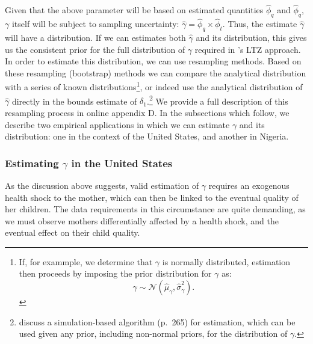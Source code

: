\documentclass[subeqn]{article}
\begin{document}
\begin{spacing}{1.4}
Given that the above parameter will be based on estimated quantities $\hat\phi_q$
and $\hat\phi_q$, $\gamma$ itself will be subject to sampling uncertainty:
$\hat\gamma = \hat\phi_q\times \hat\phi_t$.  Thus, the estimate $\hat\gamma$ will
have a distribution.  If we can estimates both $\hat\gamma$ and its distribution,
this gives us the consistent prior for the full distribution of $\gamma$ required
in \citeauthor{Conleyetal2012}'s LTZ approach.  In order to estimate this
distribution, we can use resampling methods.  Based on these resampling (bootstrap)
methods we can compare the analytical distribution with a series of known
distributions\footnote{If, for exammple, we determine that $\gamma$ is normally
  distributed, estimation then proceeds by imposing the prior distribution for
  $\gamma$ as:
  \begin{equation}
    \label{TWINeqn:ltz}
    \gamma \sim \mathcal{N}(\hat\mu_\gamma,\hat\sigma^2_\gamma).
  \end{equation}
}, or indeed use the analytical distribution of $\hat\gamma$ directly in the
bounds estimate of $\delta_1$.\footnote{\citet{Conleyetal2012} discuss a
  simulation-based algorithm (p.\ 265) for estimation, which can be used given
  any prior, including non-normal priors, for the distribution of $\gamma$.}
We provide a full description of this resampling process in online appendix
D. In the subsections which follow, we describe two
empirical applications in which we can estimate $\gamma$ and its distribution:
one in the context of the United States, and another in Nigeria.

\subsubsection{Estimating $\gamma$ in the United States}
As the discussion above suggests, valid estimation of $\gamma$ requires an
exogenous health shock to the mother, which can then be linked to the eventual
quality of her children.  The data requirements in this circumstance are quite
demanding, as we must observe mothers differentially affected by a health shock,
and the eventual effect on their child quality.


\end{spacing}
\end{document}
